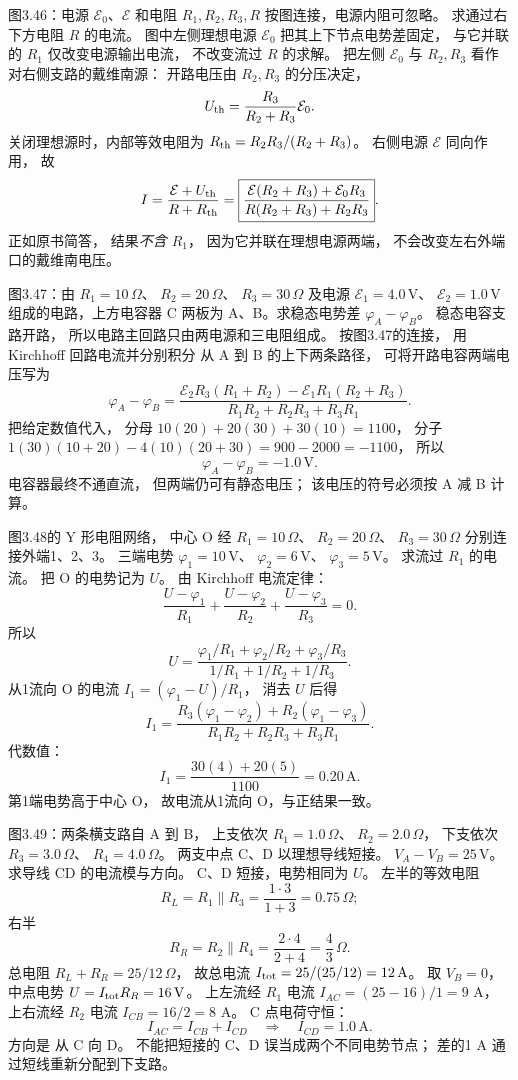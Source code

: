 图3.46：电源 $\mathcal E_0$、$\mathcal E$
和电阻 $R_1,R_2,R_3,R$
按图连接，电源内阻可忽略。
求通过右下方电阻 $R$ 的电流。
\exsolution
图中左侧理想电源 $\mathcal E_0$
把其上下节点电势差固定，
与它并联的 $R_1$ 仅改变电源输出电流，
不改变流过 $R$ 的求解。
把左侧 $\mathcal E_0$ 与 $R_2,R_3$
看作对右侧支路的戴维南源：
开路电压由 $R_2,R_3$ 的分压决定，
\[
U_{\rm th}=
\frac{R_3}{R_2+R_3}\mathcal E_0.
\]
关闭理想源时，内部等效电阻为
$R_{\rm th}=R_2R_3/(R_2+R_3)$。
右侧电源 $\mathcal E$ 同向作用，
故
\[
I=\frac{\mathcal E+U_{\rm th}}{R+R_{\rm th}}
=\boxed{
\frac{\mathcal E(R_2+R_3)+\mathcal E_0R_3}
{R(R_2+R_3)+R_2R_3}}.
\]
\excheck 正如原书简答，
结果\emph{不含 $R_1$}，
因为它并联在理想电源两端，
不会改变左右外端口的戴维南电压。

图3.47：由
$R_1=10\,\Omega$、
$R_2=20\,\Omega$、
$R_3=30\,\Omega$ 及电源
$\mathcal E_1=4.0\,\mathrm V$、
$\mathcal E_2=1.0\,\mathrm V$
组成的电路，上方电容器
C 两板为 A、B。求稳态电势差
$\varphi_A-\varphi_B$。
\exsolution
稳态电容支路开路，
所以电路主回路只由两电源和三电阻组成。
按图3.47的连接，
用 Kirchhoff 回路电流并分别积分
从 A 到 B 的上下两条路径，
可将开路电容两端电压写为
\[
\boxed{\varphi_A-\varphi_B=
\frac{\mathcal E_2R_3(R_1+R_2)
-\mathcal E_1R_1(R_2+R_3)}
{R_1R_2+R_2R_3+R_3R_1}}.
\]
把给定数值代入，
分母
$10(20)+20(30)+30(10)=1100$，
分子
$1(30)(10+20)-4(10)(20+30)
=900-2000=-1100$，
所以
\[
\boxed{\varphi_A-\varphi_B=-1.0\,\mathrm V}.
\]
\excheck 电容器最终不通直流，
但两端仍可有静态电压；
该电压的符号必须按 A 减 B 计算。

图3.48的 Y 形电阻网络，
中心 O 经
$R_1=10\,\Omega$、
$R_2=20\,\Omega$、
$R_3=30\,\Omega$
分别连接外端1、2、3。
三端电势
$\varphi_1=10\,\mathrm V$、
$\varphi_2=6\,\mathrm V$、
$\varphi_3=5\,\mathrm V$。
求流过 $R_1$ 的电流。
\exsolution
把 O 的电势记为 $U$。
由 Kirchhoff 电流定律：
\[
\frac{U-\varphi_1}{R_1}
+\frac{U-\varphi_2}{R_2}
+\frac{U-\varphi_3}{R_3}=0.
\]
所以
\[
U=
\frac{\varphi_1/R_1+\varphi_2/R_2+
\varphi_3/R_3}
{1/R_1+1/R_2+1/R_3}.
\]
从1流向 O 的电流
$I_1=(\varphi_1-U)/R_1$，
消去 $U$ 后得
\[
\boxed{I_1=
\frac{R_3(\varphi_1-\varphi_2)
+R_2(\varphi_1-\varphi_3)}
{R_1R_2+R_2R_3+R_3R_1}}.
\]
代数值：
\[
\boxed{I_1=\frac{30(4)+20(5)}{1100}
=0.20\,\mathrm A}.
\]
\excheck 第1端电势高于中心 O，
故电流从1流向 O，与正结果一致。

图3.49：两条横支路自 A 到 B，
上支依次 $R_1=1.0\,\Omega$、
$R_2=2.0\,\Omega$，
下支依次 $R_3=3.0\,\Omega$、
$R_4=4.0\,\Omega$。
两支中点 C、D 以理想导线短接。
$V_A-V_B=25\,\mathrm V$。
求导线 CD 的电流模与方向。
\exsolution
C、D 短接，电势相同为 $U$。
左半的等效电阻
\[
R_L=R_1\parallel R_3
=\frac{1\cdot3}{1+3}=0.75\,\Omega;
\]
右半
\[
R_R=R_2\parallel R_4
=\frac{2\cdot4}{2+4}=\frac43\,\Omega.
\]
总电阻
$R_L+R_R=25/12\,\Omega$，
故总电流
$I_{\rm tot}=25/(25/12)=12\,\mathrm A$。
取 $V_B=0$，
中点电势
$U=I_{\rm tot}R_R=16\,\mathrm V$。
上左流经 $R_1$ 电流
$I_{AC}=(25-16)/1=9$ A，
上右流经 $R_2$ 电流
$I_{CB}=16/2=8$ A。
C 点电荷守恒：
\[
I_{AC}=I_{CB}+I_{CD}
\quad\Longrightarrow\quad
\boxed{I_{CD}=1.0\,\mathrm A}.
\]
方向是
$\boxed{\text{从 C 向 D}}$。
\excheck 不能把短接的 C、D
误当成两个不同电势节点；
差的1 A 通过短线重新分配到下支路。

